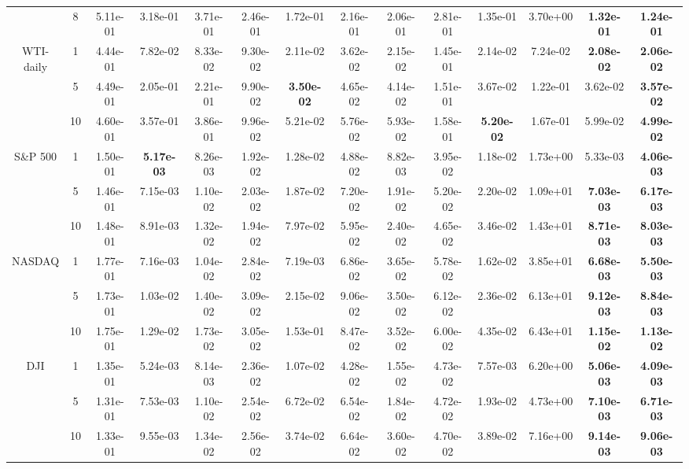 \begin{table}[!t]
{\begin{tabular}{cccccccccccccc}
 & 8& 5.11e-01& 3.18e-01 & 3.71e-01 & 2.46e-01 & 1.72e-01& 2.16e-01& 2.06e-01 & 2.81e-01 & 1.35e-01& 3.70e+00 & \bf{1.32e-01} & \bf{1.24e-01}\s \\\cmidrule(l){2-14}
\multirowcell{3}{WTI-\\daily}& 1& 4.44e-01& 7.82e-02 & 8.33e-02 & 9.30e-02 & 2.11e-02& 3.62e-02& 2.15e-02 & 1.45e-01 & 2.14e-02& 7.24e-02 & \bf{2.08e-02} & \bf{2.06e-02}\s \\\cmidrule(l){3-14}
 & 5& 4.49e-01& 2.05e-01 & 2.21e-01 & 9.90e-02 & \bf{3.50e-02}\s & 4.65e-02& 4.14e-02 & 1.51e-01 & 3.67e-02& 1.22e-01 & 3.62e-02& \bf{3.57e-02} \\\cmidrule(l){3-14}
 & 10 & 4.60e-01& 3.57e-01 & 3.86e-01 & 9.96e-02 & 5.21e-02& 5.76e-02& 5.93e-02 & 1.58e-01 & \bf{5.20e-02} & 1.67e-01 & 5.99e-02& \bf{4.99e-02}\s \\\cmidrule(l){2-14}
\multirow{3}{*}{S\&P 500}& 1& 1.50e-01& \bf{5.17e-03}& 8.26e-03 & 1.92e-02 & 1.28e-02& 4.88e-02& 8.82e-03 & 3.95e-02 & 1.18e-02& 1.73e+00 & 5.33e-03& \bf{4.06e-03}\s \\\cmidrule(l){3-14}
 & 5& 1.46e-01& 7.15e-03 & 1.10e-02 & 2.03e-02 & 1.87e-02& 7.20e-02& 1.91e-02 & 5.20e-02 & 2.20e-02& 1.09e+01 & \bf{7.03e-03} & \bf{6.17e-03}\s \\\cmidrule(l){3-14}
 & 10 & 1.48e-01& 8.91e-03 & 1.32e-02 & 1.94e-02 & 7.97e-02& 5.95e-02& 2.40e-02 & 4.65e-02 & 3.46e-02& 1.43e+01 & \bf{8.71e-03} & \bf{8.03e-03}\s \\\cmidrule(l){2-14}
\multirow{3}{*}{NASDAQ}& 1& 1.77e-01& 7.16e-03 & 1.04e-02 & 2.84e-02 & 7.19e-03& 6.86e-02& 3.65e-02 & 5.78e-02 & 1.62e-02& 3.85e+01 & \bf{6.68e-03} & \bf{5.50e-03}\s \\\cmidrule(l){3-14}
 & 5& 1.73e-01& 1.03e-02 & 1.40e-02 & 3.09e-02 & 2.15e-02& 9.06e-02& 3.50e-02 & 6.12e-02 & 2.36e-02& 6.13e+01 & \bf{9.12e-03} & \bf{8.84e-03}\s \\\cmidrule(l){3-14}
 & 10 & 1.75e-01& 1.29e-02 & 1.73e-02 & 3.05e-02 & 1.53e-01& 8.47e-02& 3.52e-02 & 6.00e-02 & 4.35e-02& 6.43e+01 & \bf{1.15e-02} & \bf{1.13e-02}\s \\\cmidrule(l){2-14}
\multirow{3}{*}{DJI} & 1& 1.35e-01& 5.24e-03 & 8.14e-03 & 2.36e-02 & 1.07e-02& 4.28e-02& 1.55e-02 & 4.73e-02 & 7.57e-03& 6.20e+00 & \bf{5.06e-03} & \bf{4.09e-03}\s \\\cmidrule(l){3-14}
 & 5& 1.31e-01& 7.53e-03 & 1.10e-02 & 2.54e-02 & 6.72e-02& 6.54e-02& 1.84e-02 & 4.72e-02 & 1.93e-02& 4.73e+00 & \bf{7.10e-03} & \bf{6.71e-03}\s \\\cmidrule(l){3-14}
 & 10 & 1.33e-01& 9.55e-03 & 1.34e-02 & 2.56e-02 & 3.74e-02& 6.64e-02& 3.60e-02 & 4.70e-02 & 3.89e-02& 7.16e+00 & \bf{9.14e-03} & \bf{9.06e-03}\s \\\cmidrule(l){2-14}

\end{tabular}}
\end{table}
